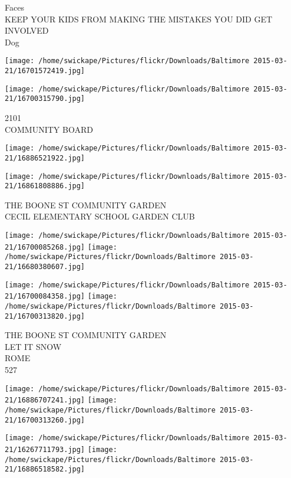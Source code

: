 \documentclass[10pt,letterpaper]{article}
\begin{document}
Faces\\
KEEP YOUR KIDS FROM MAKING THE MISTAKES YOU DID GET INVOLVED\\
Dog\\
\pagebreak

\texttt{[image: /home/swickape/Pictures/flickr/Downloads/Baltimore 2015-03-21/16701572419.jpg]}

\vspace{0.25in}
\texttt{[image: /home/swickape/Pictures/flickr/Downloads/Baltimore 2015-03-21/16700315790.jpg]}

2101\\
COMMUNITY BOARD\\
\pagebreak

\texttt{[image: /home/swickape/Pictures/flickr/Downloads/Baltimore 2015-03-21/16886521922.jpg]}

\vspace{0.25in}
\texttt{[image: /home/swickape/Pictures/flickr/Downloads/Baltimore 2015-03-21/16861808886.jpg]}

THE BOONE ST COMMUNITY GARDEN\\
CECIL ELEMENTARY SCHOOL GARDEN CLUB\\
\pagebreak

\texttt{[image: /home/swickape/Pictures/flickr/Downloads/Baltimore 2015-03-21/16700085268.jpg]}
\texttt{[image: /home/swickape/Pictures/flickr/Downloads/Baltimore 2015-03-21/16680380607.jpg]}

\texttt{[image: /home/swickape/Pictures/flickr/Downloads/Baltimore 2015-03-21/16700084358.jpg]}
\texttt{[image: /home/swickape/Pictures/flickr/Downloads/Baltimore 2015-03-21/16700313820.jpg]}

THE BOONE ST COMMUNITY GARDEN\\
LET IT SNOW\\
ROME\\
527\\
\pagebreak

\texttt{[image: /home/swickape/Pictures/flickr/Downloads/Baltimore 2015-03-21/16886707241.jpg]}
\texttt{[image: /home/swickape/Pictures/flickr/Downloads/Baltimore 2015-03-21/16700313260.jpg]}

\texttt{[image: /home/swickape/Pictures/flickr/Downloads/Baltimore 2015-03-21/16267711793.jpg]}
\texttt{[image: /home/swickape/Pictures/flickr/Downloads/Baltimore 2015-03-21/16886518582.jpg]}
\end{document}
